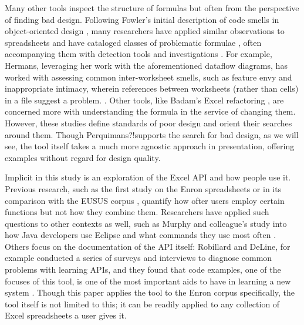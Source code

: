 \documentclass[conference]{IEEEtran}
\newcommand{\toolname}{Perquimans?!}
\begin{document}
	Many other tools inspect the structure of formulas but often from the
	perspective of finding bad design.  Following Fowler's initial description of
	code smells in object-oriented design \cite{fowler2009refactoring}, many
	researchers have applied similar observations to spreadsheets and have
	cataloged classes of problematic formulae \cite{hermans2012detecting}
	\cite{cunha2012towards} \cite{asavametha2012detecting}, often accompanying them
	with detection tools \cite{abreu2014smelling} and investigations \cite{jansen2015code}. For example, Hermans, leveraging her work with the aforementioned dataflow diagrams, has worked with assessing common inter-worksheet smells, such as feature envy and
	inappropriate intimacy, wherein references between worksheets (rather
	than cells) in a file suggest a problem. \cite{hermans2012detectinginter}. Other
	tools, like Badam's Excel refactoring \cite{badame2012refactoring}, are concerned
	more with understanding the formula in the service of changing them. 	
	However, these studies define standards of poor design and orient their searches
	around them. Though \toolname supports the search for bad design, as we will see, 
	the tool itself takes a much more agnostic approach in presentation, offering 
	examples without regard for design quality. \par
	
	Implicit in this study is an exploration of the Excel API and how people use
	it. Previous research, such as the first study on the Enron spreadsheets
	\cite{hermans2015enron} or in its comparison with the EUSUS corpus
	\cite{jansen2015enron}, quantify how ofter users employ certain functions but
	not how they combine them. Researchers have applied such questions to other
	contexts as well, such as Murphy and colleague's study into how Java developers
	use Eclipse and what commands they use most often \cite{murphy2006java}. 
	Others focus on the documentation of the API itself: Robillard and DeLine, for
	example conducted a series of surveys and interviews to diagnose common
	problems with learning APIs, and they found that code examples, one of the
	focuses of this tool, is one of the most important aids to have in learning a
	new system \cite{robillard2011field}. Though this paper applies the tool to the
	Enron corpus specifically, the tool itself is not limited to this; it can be 
	readily applied to any collection of Excel spreadsheets a user gives it.
	
\end{document}
